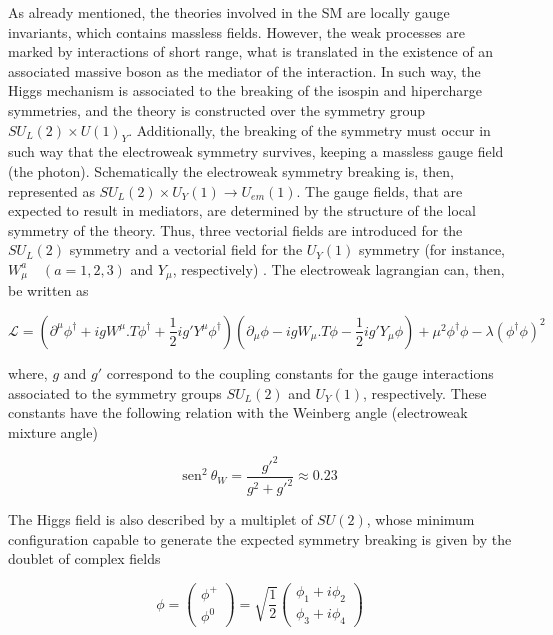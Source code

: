 As already mentioned, the theories involved in the SM are locally gauge invariants, which contains massless fields. However, the weak processes are marked by interactions of short range, what is translated in the existence of an associated massive boson as the mediator of the interaction. In such way, the Higgs mechanism is associated to the breaking of the isospin and hipercharge symmetries, and the theory is constructed over the symmetry group $SU_L(2) \times U(1)_Y$. Additionally, the breaking of the symmetry must occur in such way that the electroweak symmetry survives, keeping a massless gauge field (the photon). Schematically the electroweak symmetry breaking is, then, represented as $SU_L(2) \times U_Y(1) \rightarrow U_{em}(1)$. The gauge fields, that are expected to result in mediators, are determined by the structure of the local symmetry of the theory. Thus, three vectorial fields are introduced for the $SU_L(2)$ symmetry and a vectorial field for the $U_Y(1)$ symmetry (for instance, $W_{\mu}^a \quad (a=1,2,3)$ and $Y_{\mu}$, respectively) \cite{bib:ellis-2003}. The electroweak lagrangian can, then, be written as

\begin{equation}
\mathcal{L} = \left( \partial^{\mu}\phi^{\dagger} + ig W^{\mu}.T\phi^{\dagger} + \dfrac{1}{2}ig' Y^{\mu}\phi^{\dagger} \right) \left( \partial_{\mu}\phi - ig W_{\mu}.T\phi - \dfrac{1}{2}ig' Y_{\mu}\phi \right) + \mu^{2}\phi^{\dagger}\phi - \lambda(\phi^{\dagger}\phi)^{2}
\end{equation}

where, $g$ and $g'$ correspond to the coupling constants for the gauge interactions associated to the symmetry groups $SU_L(2)$ and $U_Y(1)$, respectively. These constants have the following relation with the Weinberg angle (electroweak mixture angle)

\begin{equation}
\textrm{sen}^{2}~\theta_W = \dfrac{g'^{2}}{g^{2}+g'^{2}} \approx 0.23
\end{equation}

The Higgs field is also described by a multiplet of $SU(2)$, whose minimum configuration capable to generate the expected symmetry breaking is given by the doublet of complex fields

\begin{equation}
\phi = \left(\begin{aligned} \phi^{+} \\ \phi^{0} \end{aligned} \right) = \sqrt{\dfrac{1}{2}} \left(\begin{aligned} \phi_1 + i\phi_2 \\ \phi_3 + i\phi_4 \end{aligned} \right)
\label{eq:Higgs_dubleto}
\end{equation}


